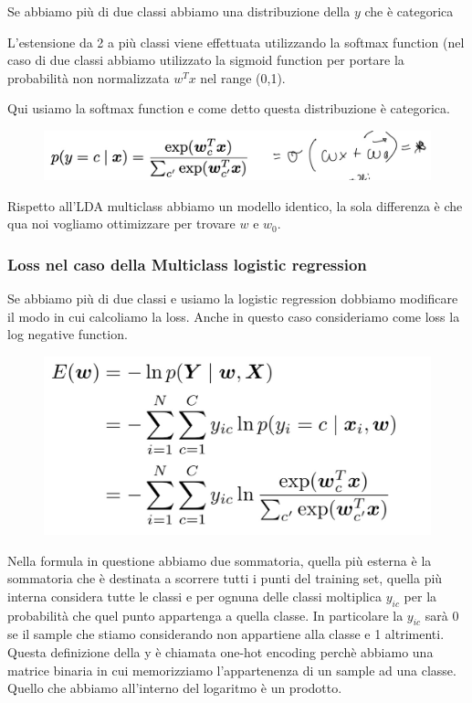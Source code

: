 \documentclass[14pt]{extreport}
\begin{document}
Se abbiamo più di due classi abbiamo una distribuzione della $y$ che è categorica

L'estensione da 2 a più classi viene effettuata utilizzando la softmax function (nel caso di due classi abbiamo utilizzato la sigmoid function per
portare la probabilità non normalizzata $w^Tx$ nel range (0,1).

Qui usiamo la softmax function e come detto questa distribuzione è categorica.
\begin{figure}[H]
\centering
\includegraphics[width=0.6\linewidth]{194.jpeg}
\end{figure}

Rispetto all'LDA multiclass abbiamo un modello identico, la sola differenza è che qua noi vogliamo ottimizzare per trovare $w$ e $w_0$.

\subsubsection{Loss nel caso della Multiclass logistic regression}

Se abbiamo più di due classi e usiamo la logistic regression dobbiamo modificare il modo in cui calcoliamo la loss. Anche in questo caso consideriamo
come loss la log negative function.

\begin{figure}[H]
\centering
\includegraphics[width=0.7\linewidth]{195.jpeg}
\end{figure}

Nella formula in questione abbiamo due sommatoria, quella più esterna è la sommatoria che è destinata a scorrere tutti i punti del training set,
quella più interna considera tutte le classi e per ognuna delle classi moltiplica $y_{ic}$ per la probabilità che quel punto appartenga a quella
classe. In particolare la $y_{ic}$ sarà 0 se il sample che stiamo considerando non appartiene alla classe e 1 altrimenti. Questa definizione della y è
chiamata one-hot encoding perchè abbiamo una matrice binaria in cui memorizziamo l'appartenenza di un sample ad una classe. Quello che abbiamo
all'interno del logaritmo è un prodotto.
\end{document}
